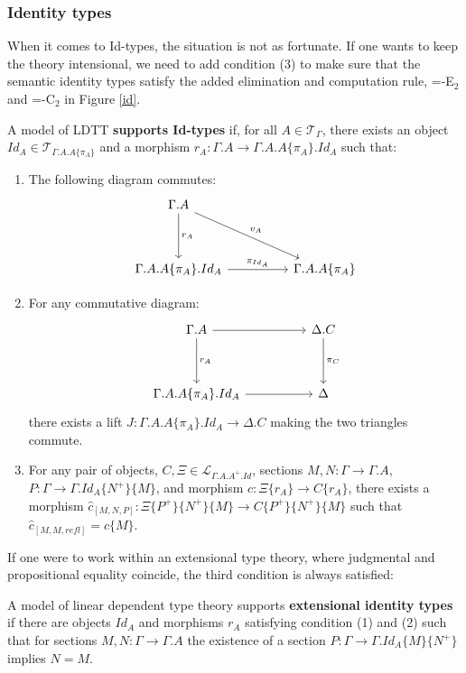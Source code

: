 \subsubsection{Identity types}
When it comes to Id-types, the situation is not as fortunate. If one wants to keep the theory intensional, we need to add condition (3) to make sure that the semantic identity types satisfy the added elimination and computation rule, =-E$_2$ and =-C$_2$ in Figure \ref{id}.

\begin{defn}[Id-types]\label{idsemantic}
  A model of LDTT \textbf{supports Id-types} if, for all $A \in \mathcal{T}_{\Gamma}$, there exists an object $Id_A \in \mathcal{T}_{\Gamma.A.A\{\pi_A\}}$ and a morphism $r_A : \Gamma.A \to \Gamma.A.A\{\pi_A\}.Id_{A}$ such that:
  \begin{enumerate}
    \item The following diagram commutes:
  \[
    \ti
    \Gamma.A \ar[d, "r_A"] \ar[rd, "v_A"]\\
    \Gamma.A.A\{\pi_A\}.Id_A \ar[r, "\pi_{Id_A}"] & \Gamma.A.A\{\pi_A\}
    \kz
  \]
\item For any commutative diagram:
  \[
    \ti
    \Gamma.A \ar[d, "r_A"] \ar[r] & \Delta.C \ar[d, "\pi_C"]\\
    \Gamma.A.A\{\pi_A\}.Id_A \ar[r] & \Delta
    \kz
  \]
  there exists a lift $J: \Gamma.A.A\{\pi_A\}.Id_A \to \Delta.C$ making the two triangles commute.
\item For any pair of objects, $C, \Xi \in \mathcal{L}_{\Gamma.A.A^+.Id}$, sections $M, N : \Gamma \to \Gamma.A$, $P : \Gamma \to \Gamma.Id_A\{N^+\}\{M\}$, and morphism $c : \Xi\{r_A\} \to C\{r_A\}$, there exists a morphism $\hat c_{[M,N,P]} : \Xi\{P^+\}\{N^+\}\{M\} \to C\{P^+\}\{N^+\}\{M\}$ such that $\hat c_{[M,M,refl]} = c\{M\}$.
\end{enumerate}
\end{defn}
If one were to work within an extensional type theory, where judgmental and propositional equality coincide, the third condition is always satisfied:
\begin{defn}A model of linear dependent type theory supports \textbf{extensional identity types} if there are objects $Id_A$ and morphisms $r_A$ satisfying condition (1) and (2) such that for sections $M,N : \Gamma \to \Gamma.A$ the existence of a section $P : \Gamma \to \Gamma.Id_A\{M\}\{N^+\}$ implies $N = M$.
\end{defn}
